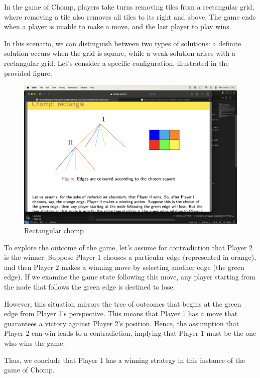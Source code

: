 \begin{example}
    In the game of Chomp, players take turns removing tiles from a rectangular grid, where removing a tile also removes all tiles to its right and above. 
    The game ends when a player is unable to make a move, and the last player to play wins.

    In this scenario, we can distinguish between two types of solutions: a definite solution occurs when the grid is square, while a weak solution arises with a rectangular grid. 
    Let's consider a specific configuration, illustrated in the provided figure.
    \begin{figure}[H]
        \centering
        \includegraphics[width=0.75\linewidth]{images/chomp.png}
        \caption{Rectangular chomp}
    \end{figure}
    To explore the outcome of the game, let's assume for contradiction that Player 2 is the winner. 
    Suppose Player 1 chooses a particular edge (represented in orange), and then Player 2 makes a winning move by selecting another edge (the green edge). 
    If we examine the game state following this move, any player starting from the node that follows the green edge is destined to lose.

    However, this situation mirrors the tree of outcomes that begins at the green edge from Player 1's perspective. 
    This means that Player 1 has a move that guarantees a victory against Player 2's position. 
    Hence, the assumption that Player 2 can win leads to a contradiction, implying that Player 1 must be the one who wins the game.
    
    Thus, we conclude that Player 1 has a winning strategy in this instance of the game of Chomp.
\end{example}